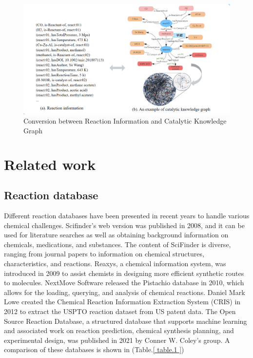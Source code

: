 \documentclass[%
 aip,
 jmp,%
 amsmath,amssymb,
 reprint,%
]{revtex4-2}
\begin{document}
\begin{figure}[htbp]
 \centering
 \includegraphics[width=1\textwidth]{figure/4.png}
 \caption{ Conversion between Reaction Information and Catalytic Knowledge Graph }
 \label{ Fig.4 }
\end{figure} 

\section{Related work}

\subsection{Reaction database}

Different reaction databases have been presented in recent years to handle various chemical challenges. Scifinder's web version was published in 2008\cite{gabrielson2018scifinder}, and it can be used for literature searches as well as obtaining background information on chemicals, medications, and substances. The content of SciFinder is diverse, ranging from journal papers to information on chemical structures, characteristics, and reactions.  Reaxys, a chemical information system, was introduced in 2009 to assist chemists in designing more efficient synthetic routes to molecules\cite{Reaxys}. NextMove Software released the Pistachio database in 2010\cite{pistachio, hormaza2007pistachio}, which allows for the loading, querying, and analysis of chemical reactions. Daniel Mark Lowe created the Chemical Reaction Information Extraction System (CRIS) in 2012 to extract the USPTO reaction dataset from US patent data\cite{lowe2012extraction}. The Open Source Reaction Database, a structured database that supports machine learning and associated work on reaction prediction, chemical synthesis planning\cite{shen2021automation, jansen2002concept}, and experimental design\cite{federer1956experimental, myers1966fundamentals, kirk2009experimental, steinberg1984experimental,seltman2012experimental}, was published in 2021 by Conner W. Coley's group\cite{kearnes2021open}. A comparison of these databases is shown in (Table.\ref{ table.1 })
\end{document}
